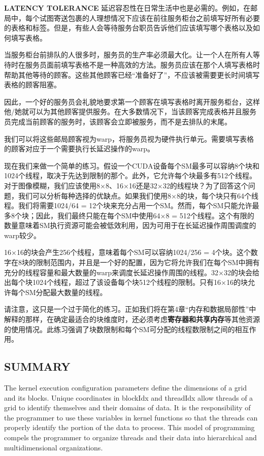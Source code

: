 \documentclass[11pt]{ctexart}
\begin{document}
\textbf{LATENCY TOLERANCE} 延迟容忍性在日常生活中也是必需的。例如，在邮局中，每个试图寄送包裹的人理想情况下应该在前往服务柜台之前填写好所有必要的表格和标签。但是，有些人会等待服务台职员告诉他们应该填写哪个表格以及如何填写表格。

当服务柜台前排队的人很多时，服务员的生产率必须最大化。让一个人在所有人等待时在服务员面前填写表格不是一种高效的方法。服务员应该在那个人填写表格时帮助其他等待的顾客。这些其他顾客已经“准备好了”，不应该被需要更长时间填写表格的顾客阻塞。

因此，一个好的服务员会礼貌地要求第一个顾客在填写表格时离开服务柜台，这样他/她就可以为其他顾客提供服务。在大多数情况下，当该顾客完成表格并且服务员完成当前顾客的服务时，该顾客会立即被服务，而不是去排队的末尾。

我们可以将这些邮局顾客视为warp，将服务员视为硬件执行单元。需要填写表格的顾客对应于一个需要执行长延迟操作的warp。


现在我们来做一个简单的练习。假设一个CUDA设备每个SM最多可以容纳8个块和1024个线程，取决于先达到限制的那个。此外，它允许每个块最多有512个线程。对于图像模糊，我们应该使用8×8、16×16还是32×32的线程块？为了回答这个问题，我们可以分析每种选择的优缺点。如果我们使用8×8的块，每个块只有64个线程。我们将需要1024/64 = 12个块来充分占用一个SM。然而，每个SM只能允许最多8个块；因此，我们最终只能在每个SM中使用64×8 = 512个线程。这个有限的数量意味着SM执行资源可能会被低效利用，因为可用于在长延迟操作周围调度的warp较少。

16×16的块会产生256个线程，意味着每个SM可以容纳1024/256 = 4个块。这个数字在8块的限制范围内，并且是一个好的配置，因为它将允许我们在每个SM中拥有充分的线程容量和最大数量的warp来调度长延迟操作周围的线程。32×32的块会给出每个块1024个线程，超过了该设备每个块512个线程的限制。只有16×16的块允许每个SM分配最大数量的线程。

请注意，这只是一个过于简化的练习。正如我们将在第4章“内存和数据局部性”中解释的那样，在确定最适合的块维度时，还必须考虑\textbf{寄存器和共享内存}等其他资源的使用情况。此练习强调了块数限制和每个SM可分配的线程数限制之间的相互作用。

\subsection{SUMMARY}

The kernel execution configuration parameters define the dimensions of a grid and its blocks. Unique coordinates in blockIdx and threadIdx allow threads of a grid to identify themselves and their domains of data. It is the responsibility of the programmer to use these variables in kernel functions so that the threads can properly identify the portion of the data to process. This model of programming compels the programmer to organize threads and their data into hierarchical and multidimensional organizations.
\end{document}
